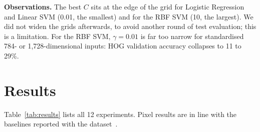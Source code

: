 \documentclass[conference]{IEEEtran}
\begin{document}
\textbf{Observations.} The best $C$ sits at the edge of the grid for Logistic Regression and Linear SVM (0.01, the
smallest) and for the RBF SVM (10, the largest). We did not widen the grids afterwards, to avoid another round of test
evaluation; this is a limitation. For the RBF SVM, $\gamma=0.01$ is far too narrow for standardised 784- or
1,728-dimensional inputs: HOG validation accuracy collapses to 11 to 29\%.

\section{Results}
Table~\ref{tab:results} lists all 12 experiments. Pixel results are in line with the baselines reported with the
dataset~\cite{xiao2017fashion}.
\end{document}

